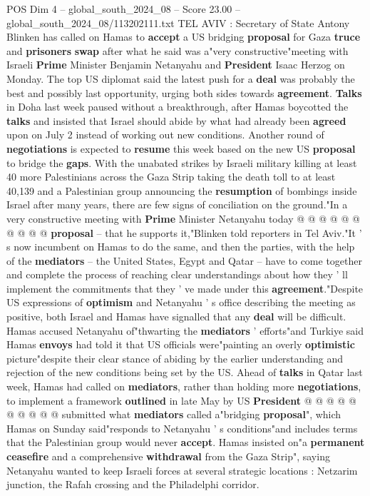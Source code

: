 \begin{textsample}{POS Dim 4 – global\_south\_2024\_08 – Score 23.00 – global\_south\_2024\_08/113202111.txt}  \label{ex:f4_pos_127}
TEL AVIV : Secretary of State Antony Blinken has called on Hamas to \textbf{accept} a US bridging \textbf{proposal} for Gaza \textbf{truce} and \textbf{prisoners} \textbf{swap} after what he said was a"very constructive"meeting with Israeli \textbf{Prime} Minister Benjamin Netanyahu and \textbf{President} Isaac Herzog on Monday.
The top US diplomat said the latest push for a \textbf{deal} was probably the best and possibly last opportunity, urging both sides towards \textbf{agreement}. \textbf{Talks} in Doha last week paused without a breakthrough, after Hamas boycotted the \textbf{talks} and insisted that Israel should abide by what had already been \textbf{agreed} upon on July 2 instead of working out new conditions.
Another round of \textbf{negotiations} is expected to \textbf{resume} this week based on the new US \textbf{proposal} to bridge the \textbf{gaps}.
With the unabated strikes by Israeli military killing at least 40 more Palestinians across the Gaza Strip taking the death toll to at least 40,139 and a Palestinian group announcing the \textbf{resumption} of bombings inside Israel after many years, there are few signs of conciliation on the ground."In a very constructive meeting with \textbf{Prime} Minister Netanyahu today @ @ @ @ @ @ @ @ @ @ \textbf{proposal} -- that he supports it,"Blinken told reporters in Tel Aviv."It ' s now incumbent on Hamas to do the same, and then the parties, with the help of the \textbf{mediators} -- the United States, Egypt and Qatar -- have to come together and complete the process of reaching clear understandings about how they ' ll implement the commitments that they ' ve made under this \textbf{agreement}."Despite US expressions of \textbf{optimism} and Netanyahu ' s office describing the meeting as positive, both Israel and Hamas have signalled that any \textbf{deal} will be difficult.
Hamas accused Netanyahu of"thwarting the \textbf{mediators} ' efforts"and Turkiye said Hamas \textbf{envoys} had told it that US officials were"painting an overly \textbf{optimistic} picture"despite their clear stance of abiding by the earlier understanding and rejection of the new conditions being set by the US.
Ahead of \textbf{talks} in Qatar last week, Hamas had called on \textbf{mediators}, rather than holding more \textbf{negotiations}, to implement a framework \textbf{outlined} in late May by US \textbf{President} @ @ @ @ @ @ @ @ @ @ submitted what \textbf{mediators} called a"bridging \textbf{proposal}", which Hamas on Sunday said"responds to Netanyahu ' s conditions"and includes terms that the Palestinian group would never \textbf{accept}.
Hamas insisted on"a \textbf{permanent} \textbf{ceasefire} and a comprehensive \textbf{withdrawal} from the Gaza Strip", saying Netanyahu wanted to keep Israeli forces at several strategic locations : Netzarim junction, the Rafah crossing and the Philadelphi corridor.

\end{textsample}
